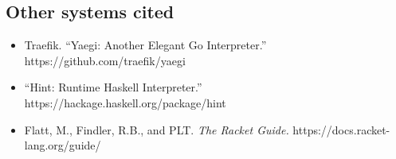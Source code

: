 \documentclass[
  12pt,
]{report}
\begin{document}
\subsection{Other systems cited}\label{other-systems-cited}

\begin{itemize}
\item
  Traefik. ``Yaegi: Another Elegant Go Interpreter.''
  https://github.com/traefik/yaegi
\item
  ``Hint: Runtime Haskell Interpreter.''
  https://hackage.haskell.org/package/hint
\item
  Flatt, M., Findler, R.B., and PLT. \emph{The Racket Guide.}
  https://docs.racket-lang.org/guide/
\end{itemize}
\end{document}
